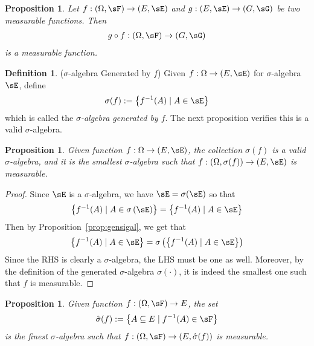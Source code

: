 \documentclass[12pt]{article}
\theoremstyle{plain}
\newtheorem{prop}[thm]{Proposition}
\theoremstyle{definition}
\newtheorem{defn}[thm]{Definition}
\theoremstyle{remark}
\newcommand{\ra}{\rightarrow}
\begin{document}

\begin{prop}
\label{prop:meascomp}
Let $f:(\Omega,\sF)\ra(E,\sE)$ and $g:(E,\sE)\ra (G,\sG)$ be two
measurable functions. Then
\begin{align*}
  g\circ f: (\Omega,\sF) \ra (G,\sG)
\end{align*}
is a measurable function.
\end{prop}

\begin{defn}($\sigma$-algebra Generated by $f$)
Given $f:\Omega\ra (E,\sE)$ for $\sigma$-algebra $\sE$, define
\begin{align*}
  \sigma(f):=\left\{ f^{-1}(A) \; |\; A \in\sE \right\}
\end{align*}
which is called the \emph{$\sigma$-algebra generated by $f$}. The next
proposition verifies this is a valid $\sigma$-algebra.
\end{defn}

\begin{prop}
Given function $f:\Omega\ra (E,\sE)$, the collection $\sigma(f)$ is a
valid $\sigma$-algebra, and it is the smallest $\sigma$-algebra such
that $f:(\Omega,\sigma(f))\ra (E,\sE)$ is measurable.
\end{prop}
\begin{proof}
Since $\sE$ is a $\sigma$-algebra, we have $\sE=\sigma(\sE)$ so that
\begin{align*}
  \left\{ f^{-1}(A) \;|\; A\in\sigma\left( \sE \right)\right\}
  =
  \left\{ f^{-1}(A) \;|\; A\in \sE \right\}
\end{align*}
Then by Proposition~\ref{prop:gensigal}, we get that
\begin{align*}
  \left\{ f^{-1}(A) \;|\; A\in \sE \right\}
  =
  \sigma\left( \left\{ f^{-1}(A) \;|\; A\in\sE \right\} \right)
\end{align*}
Since the RHS is clearly a $\sigma$-algebra, the LHS must be one as
well. Moreover, by the definition of the generated $\sigma$-algebra
$\sigma(\cdot)$, it is indeed the smallest one such that $f$ is
measurable.
\end{proof}

\begin{prop}
Given function $f:(\Omega,\sF)\ra E$, the set
\begin{align*}
  \hat{\sigma}(f)
  :=
  \left\{ A\subseteq E \; |\; f^{-1}(A)\in\sF \right\}
\end{align*}
is the \emph{finest} $\sigma$-algebra such that
$f:(\Omega,\sF)\ra (E,\hat{\sigma}(f))$ is measurable.
\end{prop}
\end{document}
